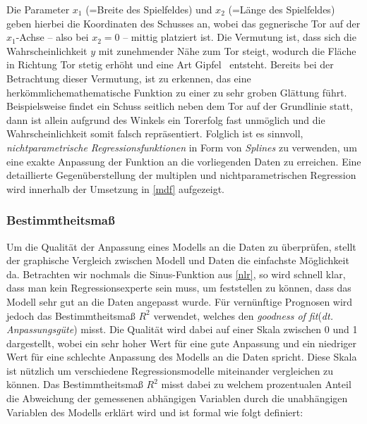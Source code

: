 Die Parameter $x_1$ (=Breite des Spielfeldes) und $x_2$ (=Länge des Spielfeldes) geben hierbei die Koordinaten des Schusses an, wobei das gegnerische Tor auf der $x_1$-Achse -- also bei $x_2=0$ -- mittig platziert ist. Die Vermutung ist, dass sich die Wahrscheinlichkeit $y$ mit zunehmender Nähe zum Tor steigt, wodurch die Fläche in Richtung Tor stetig erhöht und eine Art \glqq Gipfel\grqq~ entsteht. Bereits bei der Betrachtung dieser Vermutung, ist zu erkennen, das eine \glqq herkömmliche\grqq mathematische Funktion zu einer zu sehr groben Glättung führt. Beispielsweise findet ein Schuss seitlich neben dem Tor auf der Grundlinie statt, dann ist allein aufgrund des Winkels ein Torerfolg fast unmöglich und die Wahrscheinlichkeit somit falsch repräsentiert. Folglich ist es sinnvoll, \textit{nichtparametrische Regressionsfunktionen} in Form von \textit{Splines} zu verwenden, um eine exakte Anpassung der Funktion an die vorliegenden Daten zu erreichen. Eine detaillierte Gegenüberstellung der multiplen und nichtparametrischen Regression wird innerhalb der Umsetzung in \vref{mdf} aufgezeigt.

\subsubsection{Bestimmtheitsmaß}
Um die Qualität der Anpassung eines Modells an die Daten zu überprüfen, stellt der graphische Vergleich zwischen Modell und Daten die einfachste Möglichkeit da. Betrachten wir nochmals die Sinus-Funktion aus \vref{nlr}, so wird schnell klar, dass man kein Regressionsexperte sein muss, um feststellen zu können, dass das Modell sehr gut an die Daten angepasst wurde.  Für vernünftige Prognosen wird jedoch das Bestimmtheitsmaß $R^2$ verwendet, welches den \textit{goodness of fit}(\textit{dt. Anpassungsgüte}) misst. Die Qualität wird dabei auf einer Skala zwischen 0 und 1 dargestellt, wobei ein sehr hoher Wert für eine gute Anpassung und ein niedriger Wert für eine schlechte Anpassung des Modells an die Daten spricht. Diese Skala ist nützlich um verschiedene Regressionsmodelle miteinander vergleichen zu können. Das Bestimmtheitsmaß $R^2$ misst dabei zu welchem prozentualen Anteil die Abweichung der gemessenen abhängigen Variablen durch die unabhängigen Variablen des Modells erklärt wird und ist formal wie folgt definiert:

